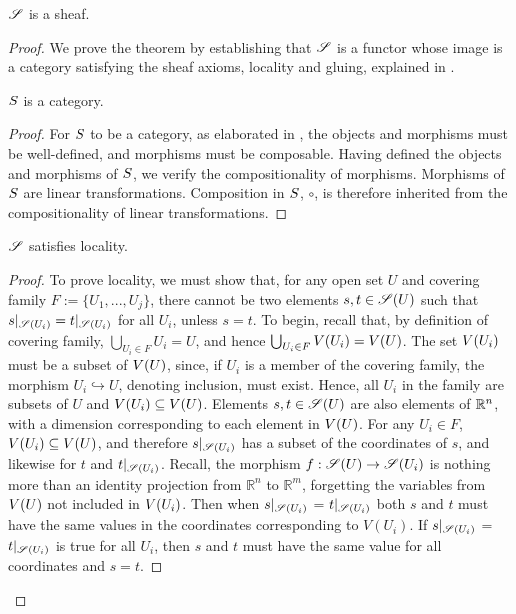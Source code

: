 \documentclass{article}
\begin{document}
\begin{theorem} 
$\mathscr{S}$ is a sheaf.
\end{theorem}
\begin{proof} 

	We prove the theorem by establishing that $\mathscr{S}$ is a functor whose
	image is a category satisfying the sheaf axioms, locality and gluing,
	explained in .

	\begin{lemma} $S$ is a category.  \end{lemma}

      \begin{proof}

      For $S$ to be a category, as elaborated in ,
      the objects and morphisms must be well-defined, and morphisms must be
      composable. Having defined the objects and morphisms of $S$, we
      verify the compositionality of morphisms. Morphisms of $S$ are
      linear transformations. Composition in $S$, $\circ$, is therefore
      inherited from the compositionality of linear transformations.

      \end{proof}

	\begin{lemma} $\mathscr{S}$ satisfies locality.  \end{lemma}

      \begin{proof}

      To prove locality, we must show that, for any open set $U$ and covering
      family $F := \{U_1, ..., U_j\}$, there cannot be two elements $s,t \in
      \mathscr{S}(U)$ such that $s|_{\mathscr{S}(U_i)} = t|_{\mathscr{S}(U_i)}$ for all $U_i$, unless
      $s = t$.  To begin, recall that, by definition of covering family,
      $\bigcup_{U_i\in F} U_i = U$, and hence $\bigcup_{U_i \in F} V({U_i}) =
      V({U})$.  The set $V({U_i})$ must be a subset of $V({U})$, since, if
      $U_i$ is a member of the covering family, the morphism $U_i
      \hookrightarrow U$, denoting inclusion,  must exist.  Hence, all $U_i$ in
      the family are subsets of $U$ and $V({U_i}) \subseteq V({U})$.
      Elements $s,t \in \mathscr{S}(U)$ are also elements of $\mathbb{R}^n$, with a
      dimension corresponding to each element in $V({U})$. For any $U_i \in
      F$, $V({U_i}) \subseteq V({U})$, and therefore $s|_{\mathscr{S}(U_i)}$ has a
      subset of the coordinates of $s$, and likewise for $t$ and
      $t|_{\mathscr{S}(U_i)}$. Recall, the morphism $f: \mathscr{S}(U) \to \mathscr{S}(U_i)$ is nothing more than 
an identity projection from $\mathbb{R}^n$ to $\mathbb{R}^m$, forgetting 
the variables from $V({U})$ not included in $V({U_i})$. Then when $s|_{\mathscr{S}(U_i)}$ = $t|_{\mathscr{S}(U_i)}$ both $s$ and $t$
      must have the same values in the coordinates corresponding to $V(U_i)$.
      If $s|_{\mathscr{S}(U_i)}$ = $t|_{\mathscr{S}(U_i)}$ is true for all $U_i$, then $s$ and
      $t$ must have the same value for all coordinates and $s = t$.


\end{proof}
\end{proof}
\end{document}

